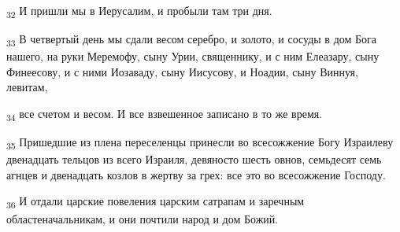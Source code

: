 \begin{tcolorbox}
\textsubscript{32} И пришли мы в Иерусалим, и пробыли там три дня.
\end{tcolorbox}
\begin{tcolorbox}
\textsubscript{33} В четвертый день мы сдали весом серебро, и золото, и сосуды в дом Бога нашего, на руки Меремофу, сыну Урии, священнику, и с ним Елеазару, сыну Финеесову, и с ними Иозаваду, сыну Иисусову, и Ноадии, сыну Виннуя, левитам,
\end{tcolorbox}
\begin{tcolorbox}
\textsubscript{34} все счетом и весом. И все взвешенное записано в то же время.
\end{tcolorbox}
\begin{tcolorbox}
\textsubscript{35} Пришедшие из плена переселенцы принесли во всесожжение Богу Израилеву двенадцать тельцов из всего Израиля, девяносто шесть овнов, семьдесят семь агнцев и двенадцать козлов в жертву за грех: все это во всесожжение Господу.
\end{tcolorbox}
\begin{tcolorbox}
\textsubscript{36} И отдали царские повеления царским сатрапам и заречным областеначальникам, и они почтили народ и дом Божий.
\end{tcolorbox}
